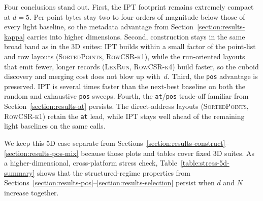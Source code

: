 \documentclass[manuscript,screen,review]{acmart}
\theoremstyle{definition}
\theoremstyle{plain}
\begin{document}
\begin{table}[ht]
\caption{Aggregate \texttt{multiple-survey-9-5d} measurements
  (\texttt{c0r1e1l0}). The footprint columns are platform-independent.
  The construction and \texttt{pos}/\texttt{at} columns report
  geometric means across all 21 platform/compiler runs. Each metric is
  paired with its IPT-relative ratio for IPT and the applicable light
  baselines. Cells marked $^{\dagger}$ aggregate at least one
  platform/compiler cell whose per-repetition spread
  $(p_{90}-p_{10})/\mathrm{median}$ exceeds $20\%$. Ratio cells
  inherit the mark from either operand.}
\label{table:stress-5d-summary}

\end{table}

Four conclusions stand out. First, the IPT footprint remains
extremely compact at $d=5$. Per-point bytes stay two to four orders
of magnitude below those of every light baseline, so the metadata
advantage from Section~\ref{section:results-kappa} carries into higher
dimensions. Second, construction stays in the same broad band as in
the 3D suites: IPT builds within a small factor of the point-list and
row layouts (\textsc{SortedPoints}, \textsc{RowCSR-k1}),
while the run-oriented layouts that emit fewer, longer records
(\textsc{LexRun}, \textsc{RowCSR-k4}) build faster, so
the cuboid discovery and merging cost does not blow up with~$d$.
Third, the \texttt{pos} advantage is preserved. IPT is
several times faster than the next-best baseline on both the random
and exhaustive \texttt{pos} sweeps. Fourth, the
\texttt{at}/\texttt{pos} trade-off familiar from
Section~\ref{section:results-at} persists. The direct-address layouts
(\textsc{SortedPoints}, \textsc{RowCSR-k1}) retain the
\texttt{at} lead, while IPT stays well ahead of the remaining light
baselines on the same calls.

We keep this 5D case separate from
Sections~\ref{section:results-construct}--\ref{section:results-pos-mix}
because those plots and tables cover fixed 3D suites. As a
higher-dimensional, cross-platform stress check,
Table~\ref{table:stress-5d-summary} shows that the structured-regime
properties from
Sections~\ref{section:results-pos}--\ref{section:results-selection}
persist when $d$ and $N$ increase together.
\end{document}
